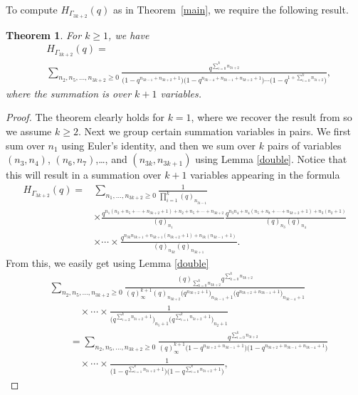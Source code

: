 \documentclass[pdftex]{sigma}
\numberwithin{equation}{section}
\newtheorem{Theorem}{Theorem}[section]
\theoremstyle{definition}
\begin{document}
To compute $H_{\Gamma_{3k+2}}(q)$ as in Theorem~\ref{main}, we require the following result.
\begin{Theorem} \label{3k2} For $k \geq 1$, we have
\begin{align*}
& H_{\Gamma_{3k+2}}(q) =\\
& \sum_{n_{2},n_{5},\dots,n_{3k+2} \geq 0} \frac{q^{\sum_{i=0}^k n_{3i+2}}}{\bigl(1-q^{n_{3k-1}+n_{3k+2}+1}\bigr)\bigl(1-q^{n_{3k-4}+n_{3k-1}+n_{3k+2}+1}\bigr) \cdots \bigl(1-q^{{1+\sum_{i=0}^k n_{3i+2}}}\bigr)},
\end{align*}
where the summation is over $k+1$ variables.
\end{Theorem}
\begin{proof} The theorem clearly holds for $k=1$, where we recover the result from \cite{BJM} so we assume $k \geq 2$.
Next we group certain summation variables in pairs. We first sum over $n_1$ using Euler's identity, and then we sum over $k$ pairs of variables $(n_{3},n_{4})$, $(n_{6},n_{7})$,\dots, and $(n_{3k},n_{3k+1})$ using
Lemma \ref{double}. Notice that this will result in a summation over $k+1$ variables appearing in the formula
\begin{align*}
H_{\Gamma_{3k+2}}(q)={}&\sum_{n_1,\dots,n_{3k+2} \geq 0} \frac{1}{\prod_{i=1}^k (q)_{n_{3i-1}}} \\
&
\times \frac{q^{n_1(n_2+n_5+\cdots +n_{3k+2}+1)+n_2+n_5+\cdots +n_{3k+2}}}{(q)_{n_1}} \frac{q^{n_3 n_4+n_4(n_5+n_8+\cdots + n_{3k+2}+1)+n_3(n_2+1)}}{(q)_{n_3}(q)_{n_4}}
\\
&
\times \cdots \times \frac{q^{n_{3k} n_{3k+1}+n_{3k+1}(n_{3k+2}+1)+n_{3k}(n_{3k-1}+1)}}{(q)_{n_{3k}}(q)_{n_{3k+1}}}.
\end{align*}
From this, we easily get using Lemma \ref{double}
\begin{align*}
& \sum_{n_2,n_5,\dots,n_{3k+2} \geq 0} \frac{(q)_{\sum_{k=0}^{k} n_{3k+2}} q^{\sum_{k=0}^{k} n_{3k+2}}}{(q)_\infty^{k+1} (q)_{n_{3k+2}}\bigl(q^{n_{3k+2}+1}\bigr)_{n_{3k-1}+1} \bigl(q^{n_{3k+2}+n_{3k-1}+1}\bigr)_{n_{3k-4}+1}} \\
&\qquad\quad {}\times \cdots \times \frac{1}{\bigl(q^{\sum_{i=2}^k n_{3i+2}+1}\bigr)_{n_5+1} \bigl(q^{\sum_{i=1}^k n_{3i+2}+1}\bigr)_{n_2+1}}
\\
&\qquad=\sum_{n_2,n_5,\dots,n_{3k+2} \geq 0} \frac{q^{\sum_{i=0}^k n_{3i+2}}}{(q)_\infty^{k+1} \bigl(1-q^{n_{3k+2}+n_{3k-1}+1}\bigr)\bigl(1-q^{n_{3k+2}+n_{3k-1}+n_{3k-4}+1}\bigr)}\\
&\qquad\quad {}
\times \cdots \times \frac{1}{\bigl(1-q^{\sum_{i=1}^k n_{3i+2}+1}\bigr) \bigl(1-q^{\sum_{i=0}^k n_{3i+2}+1}\bigr)},

\end{align*}
\end{proof}
\end{document}
